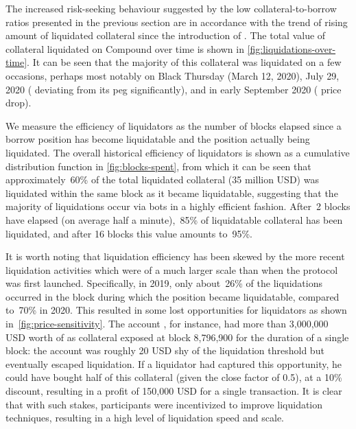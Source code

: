 The increased risk-seeking behaviour suggested by the low collateral-to-borrow ratios presented in the previous section are in accordance with the trend of rising amount of liquidated collateral since the introduction of .
The total value of collateral liquidated on Compound over time is shown in \autoref{fig:liquidations-over-time}.
It can be seen that the majority of this collateral was liquidated on a few occasions, perhaps most notably on Black Thursday (March 12, 2020), July 29, 2020 ( deviating from its peg significantly), and in early September 2020 ( price drop).

We measure the efficiency of liquidators as the number of blocks elapsed since a borrow position has become liquidatable and the position actually being liquidated.
The overall historical efficiency of liquidators is shown as a cumulative distribution function in \autoref{fig:blocks-spent}, from which it can be seen that approximately~60\% of the total liquidated collateral (35 million USD) was liquidated within the same block as it became liquidatable, suggesting that the majority of liquidations occur via bots in a highly efficient fashion.
After~2 blocks have elapsed (on average half a minute),~85\% of liquidatable collateral has been liquidated, and after 16 blocks this value amounts to~95\%.

It is worth noting that liquidation efficiency has been skewed by the more recent liquidation activities which were of a much larger scale than when the protocol was first launched.
Specifically, in 2019, only about~26\% of the liquidations occurred in the block during which the position became liquidatable, compared to~70\% in 2020.
This resulted in some lost opportunities for liquidators as shown in~\autoref{fig:price-sensitivity}.
The account , for instance, had more than 3,000,000 USD worth of  as collateral exposed at block 8,796,900 for the duration of a single block: the account was roughly 20 USD shy of the liquidation threshold but eventually escaped liquidation.
If a liquidator had captured this opportunity, he could have bought half of this collateral (given the close factor of 0.5), at a 10\% discount, resulting in a profit of 150,000 USD for a single transaction.
It is clear that with such stakes, participants were incentivized to improve liquidation techniques, resulting in a high level of liquidation speed and scale.

